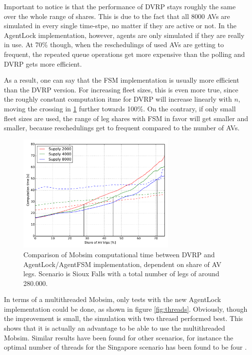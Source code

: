 Important to notice is that the performance of DVRP stays roughly the same over
the whole range of shares. This is due to the fact that all 8000 AVs are simulated
in every single time-stpe, no matter if they are active or not. In the AgentLock
implementation, however, agents are only simulated if they are really in use. At
70\% though, when the reschedulings of used AVs are getting to frequent, the repeated
queue operations get more expensive than the polling and DVRP gets more efficient.

As a result, one can say that the FSM implementation is usually more efficient than
the DVRP version. For increasing fleet sizes, this is even more true, since the
roughly constant computation itme for DVRP will increase linearly with $n$, moving
the crossing in \cref{fig:dvrpfsm} further towards 100\%. On the contrary, if only
small fleet sizes are used, the range of leg shares with FSM in favor will get
smaller and smaller, because reschedulings get to frequent compared to the number
of AVs.

\begin{figure}
    \centering
    \includegraphics[width=0.7\textwidth]{figures/dvrp_fsm.pdf}
    \caption{Comparison of Mobsim computational time between DVRP and AgentLock/AgentFSM implementation, dependent on share of AV legs. Scenario is Sioux Falls with
    a total number of legs of around 280.000. }
    \label{fig:dvrpfsm}
\end{figure}

In terms of a multithreaded Mobsim, only tests with the new AgentLock implementation
could be done, as shown in figure \cref{fig:threads}. Obviously, though the improvement
is small, the simulation with two threasd performed best. This shows that it is
actually an advantage to be able to use the multithreaded Mobsim. Similar results
have been found for other scenarios, for instance the optimal number of threads
for the Singapore scenario has been found to be four \citep{Erath2014}.

